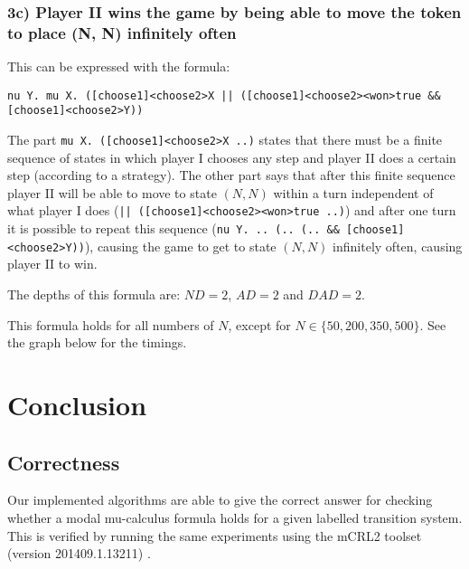 \documentclass[10pt,a4paper]{article}
\begin{document}
\subsubsection{3c) Player II wins the game by being able to move the token to place (N, N) infinitely often}\label{board3}
This can be expressed with the formula:

\begin{center}
	{\tt nu Y. mu X. ([choose1]<choose2>X || ([choose1]<choose2><won>true \&\& [choose1]<choose2>Y))}
\end{center}

The part {\tt mu X. ([choose1]<choose2>X ..)} states that there must be a finite sequence of states in which player I chooses any step and player II does a certain step (according to a strategy). The other part says that after this finite sequence player II will be able to move to state $(N, N)$ within a turn independent of what player I does ({\tt || ([choose1]<choose2><won>true ..)}) and after one turn it is possible to repeat this sequence ({\tt nu Y. .. (.. (.. \&\& [choose1]<choose2>Y))}), causing the game to get to state $(N, N)$ infinitely often, causing player II to win.

The depths of this formula are: $ND = 2$, $AD = 2$ and $DAD = 2$.

This formula holds for all numbers of $N$, except for $N \in \{50, 200, 350, 500\}$. See the graph below for the timings.



\section{Conclusion}\label{conc}

\subsection{Correctness}
Our implemented algorithms are able to give the correct answer for checking whether a modal mu-calculus formula holds for a given labelled transition system. This is verified by running the same experiments using the mCRL2 toolset (version 201409.1.13211) \cite{mcrl2}.
\end{document}
